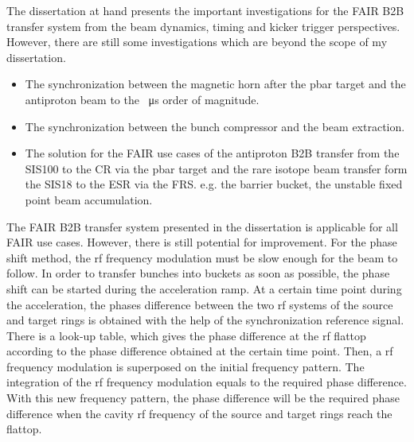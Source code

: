 The dissertation at hand presents the important investigations for the FAIR B2B transfer system from the beam dynamics, timing and kicker trigger perspectives. However, there are still some investigations which are beyond the scope of my dissertation.
\begin{itemize}
	\item The synchronization between the magnetic horn after the pbar target and the antiproton beam to the \SI{}{\us} order of magnitude.

	\item  The synchronization between the bunch compressor and the beam extraction.

	\item The solution for the FAIR use cases of the antiproton B2B transfer from the SIS100 to the CR via the pbar target and the rare isotope beam transfer form the SIS18 to the ESR via the FRS. e.g. the barrier bucket, the unstable fixed point beam accumulation.

\end{itemize}


The FAIR B2B transfer system presented in the dissertation is applicable for all FAIR use cases. However, there is still potential for improvement. For the phase shift method, the rf frequency modulation must be slow enough for the beam to follow. In order to transfer bunches into buckets as soon as possible, the phase shift can be started during the acceleration ramp. At a certain time point during the acceleration, the phases difference between the two rf systems of the source and target rings is obtained with the help of the synchronization reference signal. There is a look-up table, which gives the phase difference at the rf flattop according to the phase difference obtained at the certain time point. Then, a rf frequency modulation is superposed on the initial frequency pattern. The integration of the rf frequency modulation equals to the required phase difference. With this new frequency pattern, the phase difference will be the required phase difference when the cavity rf frequency of the source and target rings reach the flattop. 

